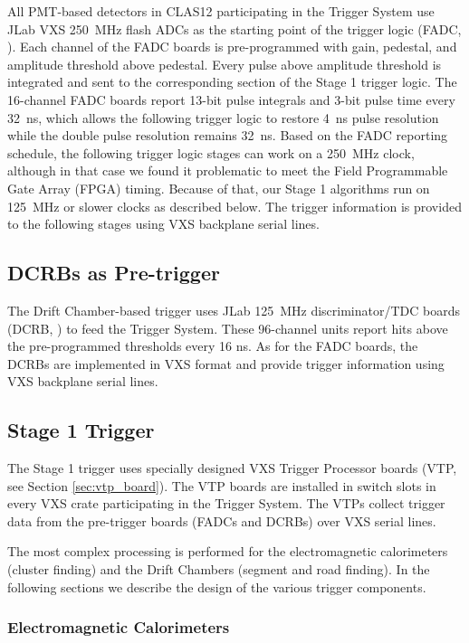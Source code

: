 All PMT-based detectors in CLAS12 participating in the Trigger System use JLab VXS 250~MHz flash ADCs as the starting point of the trigger logic (FADC, \cite{daq-ref}). Each channel of the FADC boards is pre-programmed with gain, pedestal, and amplitude threshold above pedestal. Every pulse above amplitude threshold is integrated and sent to the corresponding section of the Stage 1 trigger logic. The 16-channel FADC boards report 13-bit pulse integrals and 3-bit pulse time every 32~ns, which allows the following trigger logic to restore 4~ns pulse resolution while the double pulse resolution remains 32~ns. Based on the FADC reporting schedule, the following trigger logic stages can work on a 250~MHz clock, although in that case we found it problematic to meet the Field Programmable Gate Array (FPGA) timing. Because of that, our Stage 1 algorithms run on 125~MHz or slower clocks as described below. The trigger information is provided to the following stages using VXS backplane serial lines.


\subsection{DCRBs as Pre-trigger}

The Drift Chamber-based trigger uses JLab 125~MHz discriminator/TDC boards (DCRB, \cite{daq-ref}) to feed the Trigger System. These 96-channel units report hits above the pre-programmed thresholds every 16 ns. As for the FADC boards, the DCRBs are implemented in VXS format and provide trigger information using VXS backplane serial lines.


\subsection{Stage 1 Trigger} 

The Stage 1 trigger uses specially designed VXS Trigger Processor boards (VTP, see Section \ref*{sec:vtp_board}). The VTP boards are installed in switch slots in every VXS crate participating in the Trigger System. The VTPs collect trigger data from the pre-trigger boards (FADCs and DCRBs) over VXS serial lines.

The most complex processing is performed for the electromagnetic calorimeters (cluster finding) and the Drift Chambers (segment and road finding). In the following sections we describe the design of the various trigger components.


\subsubsection{Electromagnetic Calorimeters}
\label{sec:ECAL}

